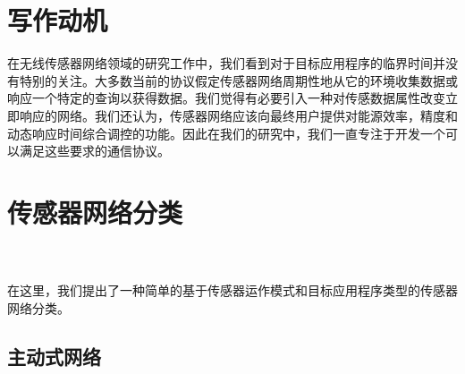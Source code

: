 \documentclass[journal]{IEEEtran}
\begin{document}
\begin{CJK}{UTF8}{gbsn}
\section{\textbf{写作动机\\ }}

在无线传感器网络领域的研究工作中，我们看到对于目标应用程序的临界时间并没有特别的关注。大多数当前的协议假定传感器网络周期性地从它的环境收集数据或响应一个特定的查询以获得数据。我们觉得有必要引入一种对传感数据属性改变立即响应的网络。我们还认为，传感器网络应该向最终用户提供对能源效率，精度和动态响应时间综合调控的功能。因此在我们的研究中，我们一直专注于开发一个可以满足这些要求的通信协议。

%

\section{\textbf{传感器网络分类\\ \\ }}

在这里，我们提出了一种简单的基于传感器运作模式和目标应用程序类型的传感器网络分类。


\subsection{\textbf{主动式网络}}


\end{CJK}
\end{document}
